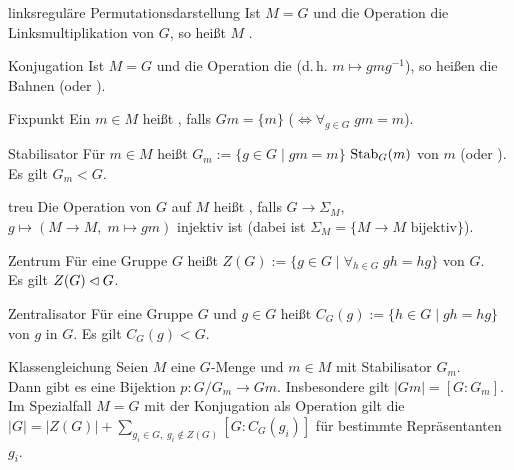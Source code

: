 \begin{Def}{linksreguläre Permutationsdarstellung}
    Ist $M = G$ und die Operation die Linksmultiplikation von $G$,
    so heißt $M$ .
\end{Def}

\begin{Def}{Konjugation}
    Ist $M = G$ und die Operation die 
    (d.\,h. $m \mapsto gmg^{-1}$), so heißen die Bahnen
     (oder ).
\end{Def}

\begin{Def}{Fixpunkt}
    Ein $m \in M$ heißt , falls $Gm = \{m\}$
    ($\!\!\iff \forall_{g \in G}\; gm = m$).
\end{Def}

\begin{Def}{Stabilisator}
    Für $m \in M$ heißt $G_m := \{g \in G \;|\; gm = m\}$
     $\operatorname{Stab}_G(m)$ von $m$
    (oder ).
    Es gilt $G_m < G$.
\end{Def}

\begin{Def}{treu}
    Die Operation von $G$ auf $M$ heißt , falls
    $G \rightarrow \Sigma_M$, $g \mapsto (M \rightarrow M,\; m \mapsto gm)$
    injektiv ist
    (dabei ist $\Sigma_M = \{M \rightarrow M \text{ bijektiv}\}$).
\end{Def}

\linie

\begin{Def}{Zentrum}
    Für eine Gruppe $G$ heißt
    $Z(G) := \{g \in G \;|\; \forall_{h \in G}\; gh = hg\}$
     von $G$.\\
    Es gilt $Z(G) \mathbin{\vartriangleleft} G$.
\end{Def}

\begin{Def}{Zentralisator}
    Für eine Gruppe $G$ und $g \in G$ heißt
    $C_G(g) := \{h \in G \;|\; gh = hg\}$\\
     von $g$ in $G$.
    Es gilt $C_G(g) < G$.
\end{Def}

\begin{Prop}{Klassengleichung}
    Seien $M$ eine $G$-Menge und $m \in M$ mit Stabilisator $G_m$.\\
    Dann gibt es eine Bijektion $p\colon G/G_m \rightarrow Gm$.
    Insbesondere gilt $|Gm| = [G:G_m]$.\\
    Im Spezialfall $M = G$ mit der Konjugation als Operation
    gilt die \\
    $|G| = |Z(G)| + \sum_{g_i \in G,\; g_i \notin Z(G)} [G:C_G(g_i)]$
    für bestimmte Repräsentanten $g_i$.
\end{Prop}

